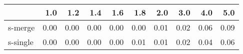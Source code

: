 \begin{tabular}{lrrrrrrrrr}
\toprule
{} &  1.0 &  1.2 &  1.4 &  1.6 &  1.8 &  2.0 &  3.0 &  4.0 &  5.0 \\
\midrule
s-merge  & 0.00 & 0.00 & 0.00 & 0.00 & 0.00 & 0.01 & 0.02 & 0.06 & 0.09 \\
s-single & 0.00 & 0.00 & 0.00 & 0.00 & 0.01 & 0.01 & 0.02 & 0.04 & 0.06 \\
\bottomrule
\end{tabular}
